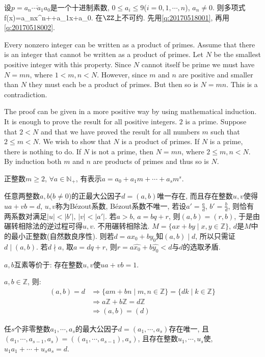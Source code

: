 设$p=\overline{a_n\cdots a_1a_0}$是一个十进制素数, $0\le a_i\le9$($i=0,1,\cdots, n$), $a_n\ne0$. 则多项式
\bee
f(x)=a_nx^n+\cdots+a_1x+a_0.
\eee
在$\ZZ$上不可约.
\et
\ba
先用\ref{q:20170518001}, 再用\ref{q:20170518002}.
\ea

\bt{}{}
Every nonzero integer can be written as a product of primes.
\et
\ba
Assume that there is an integer that cannot be written as a product of primes.
Let $N$ be the smallest positive integer with this property. Since $N$ cannot itself be prime we must have
$N=mn$, where $1<m, n<N$. However, since $m$ and $n$ are positive and smaller than $N$ they must each be a product
of primes. But then so is $N=mn$. This is a contradiction.

The proof can be given in a more positive way by using mathematical induction.
It is enough to prove the result for all positive integers. $2$ is a prime.
Suppose that $2<N$ and that we have proved the result for all numbers $m$ such that $2\le m<N$. 
We wish to show that $N$ is a product of primes. 
If $N$ is a prime, there is nothing to do. 
If $N$ is not a prime, then $N=mn$, where $2\le m, n<N$. 
By induction both $m$ and $n$ are products of primes and thus so is $N$.
\ea

正整数$m\ge2$, $\forall a\in\mathbb{N}_{+}$, 有表示$a=a_0+a_1m+\cdots+a_sm^s$.
\et

任意两整数$a,b$($b\ne0$)的正最大公因子$d=(a,b)$唯一存在, 而且存在整数$u,v$使得$ua+vb=d$, 
$u,v$称为B\'{e}zout系数, B\'{e}zout系数不唯一, 若设$a'=\frac{a}{d}$, $b'=\frac{b}{d}$, 则恰有两系数对满足$|u|<|b'|$, $|v|<|a'|$.
\et
\ba
若$a>b$, $a=bq+r$, 则$(a,b)=(r,b)$, 于是由碾转相除法的逆过程可得$u,v$.
\ea
\ba
不用碾转相除法. $M=\{ax+by\mid x,y\in\mathbb{Z}\}$, $d$是$M$中的最小正整数(自然数良序性).
则若$d=ax_0+by_0$知$(a,b)\mid d$, 所以只需证$d\mid(a,b)$.
若$d\nmid a$, 取$a=dq+r$, 则$r=a\hat{x_0}+b\hat{y_0}<d$与$d$的选取矛盾.
\ea

\bc{}{}
$a,b$互素等价于: 存在整数$u,v$使$ua+vb=1$.

$a,b\in\mathbb{Z}$, 则:
\begin{align*}
 (a,b)=d & \Rightarrow \{am+bn\mid m,n\in\mathbb{Z}\}=\{dk\mid k\in\mathbb{Z}\}\\
      & \Rightarrow a\mathbb{Z}+b\mathbb{Z}=d\mathbb{Z}\\
      & \Rightarrow (a,b)=(d)
\end{align*}
\ec

任$s$个非零整数$a_1,\cdots, a_s$的最大公因子$d=(a_1,\cdots,a_s)$存在唯一, 且$(a_1,\cdots,a_{s-1},a_{s})=((a_1,\cdots,a_{s-1}),a_{s})$,
且存在整数$u_1,\cdots,u_s$使, $u_1a_1+\cdots+u_sa_s=d$.
\ec

